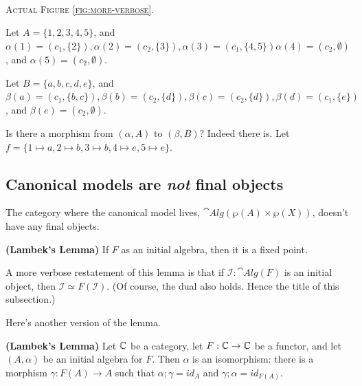 \begin{minipage}[b]{0.3\linewidth}
\begin{center}
\\
\textsc{Actual Figure \ref{fig:more-verbose}. } 
\end{center}
\end{minipage}


Let $A = \{1, 2, 3, 4, 5\}$, and $\alpha(1) = (c_1, \{2\}), \alpha(2) = (c_2, \{3\}), \alpha(3) = (c_1, \{4, 5\}) \alpha(4) = (c_2, \emptyset)$, and $\alpha(5) = (c_2, \emptyset)$.

Let $B = \{a, b, c, d, e\}$, and $\beta(a) = (c_1, \{b, c\}), \beta(b) = (c_2, \{d\}), \beta(c) = (c_2, \{d\}), \beta(d) = (c_1, \{e\})$, and $\beta(e) = (c_2, \emptyset)$.

Is there a morphism from $(\alpha, A)$ to $(\beta, B)$? Indeed there is. Let $f = \{1 \mapsto a, 2 \mapsto b, 3 \mapsto b, 4 \mapsto e, 5 \mapsto e\}$.



\subsection{Canonical models are \emph{not} final objects} The category where the canonical model lives, $\cat{Alg}(\wp(A) \times \wp(X))$, doesn't have any final objects.

\begin{lem}
  \textbf{(Lambek's Lemma)} If $F$ as an initial algebra, then it is a fixed point.
\end{lem}

A more verbose restatement of this lemma is that if $\mathcal I : \cat{Alg}(F)$ is an initial object, then $\mathcal I \simeq F(\mathcal I)$. (Of course, the dual also holds. Hence the title of this subsection.)

Here's another version of the lemma. 

\begin{lem} \textbf{(Lambek's Lemma)} Let $\mathbb{C}$ be a category, let $F : \mathbb{C} \to \mathbb{C}$ be a functor, and let $(A, \alpha)$ be an initial algebra for $F$. Then $\alpha$ is an isomorphism: there is a morphism $\gamma : F(A) \to A$ such that $\alpha ; \gamma = id_A$ and $\gamma ; \alpha = id_{F(A)}$.  
\end{lem}

